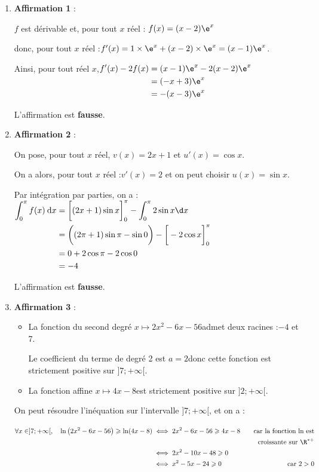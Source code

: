 	\begin{enumerate}
		\item \textbf{Affirmation 1} :

		$f$ est dérivable  et, pour tout $x$ réel : \quad $f(x) = (x - 2)\e^x$

		donc, pour tout $x$ réel :\quad $f'(x)=1\times \e^x + (x-2)\times \e^x = ( x-1)\e^x$.

		Ainsi, pour tout réel $x$,\quad $\aligned[t]
		f'(x)-2f(x) & =(x-1)\e^x-2(x-2)\e^x \\
		& =(-x+3)\e^x \\
		& = -(x-3)\e^x
		\endaligned$

		L'affirmation est \textbf{fausse}.

		\item \textbf{Affirmation 2} :

		On pose, pour tout $x$ réel, \quad $v(x)=2x+1$ \quad et \quad $u'(x)=\cos x$.

		On a alors, pour tout $x$ réel :\quad $v'(x)=2$ \quad  et on peut choisir \quad $u(x)=\sin x$.

		Par intégration par parties, on a :\quad
		$\aligned[t]
		\displaystyle\int_0^{\pi} f(x)\:\text{d}x &= \bigg[ (2x+1) \sin x \bigg]_0^{\pi} - \displaystyle \int_0^{\pi} 2 \sin x \d x\\
		&= \bigg( (2 \pi +1) \sin \pi - \sin 0 \bigg) - \bigg[-2 \cos x \bigg]_0^{\pi} \\
		&= 0 + 2 \cos \pi -2 \cos 0 \\
		&= -4
		\endaligned$

		L'affirmation est \textbf{fausse}.

		\item \textbf{Affirmation 3} :

		\begin{itemize}
			\item La fonction du second degré \quad $x \longmapsto 2x^2-6x-56$\quad admet deux racines :\quad $-4$ et 7.

			Le coefficient du terme de degré 2 est \quad $a=2$\quad  donc cette fonction est strictement positive sur $]7 ; +\infty[$.

			\item La fonction affine \quad $x \longmapsto 4x-8$\quad  est strictement positive sur $]2 ;+\infty[$.
		\end{itemize}

		On peut résoudre l'inéquation sur l'intervalle $]7 ; +\infty[$, et on a :

		$\aligned[t] \forall x \in ]7 ;+\infty[, \quad
		\ln \left(2x^2 - 6x - 56\right) \geqslant \ln(4x - 8)
		& \iff 2x^2 - 6x - 56 \geqslant 4x - 8 \quad &\text{car la fonction ln est}\\
		&&\text{croissante sur }\R^{*+}\\
		& \iff 2x^2 - 10x - 48 \geqslant 0 \\
		& \iff x^2-5x-24 \geqslant 0&\text{car }2 >0
		\endaligned$


\end{enumerate}

